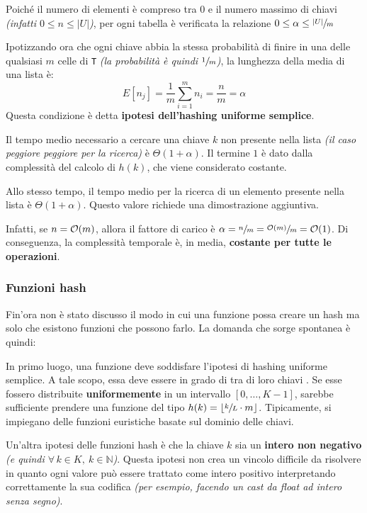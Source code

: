 \documentclass[italian, 10pt]{article}
\begin{document}
Poiché il numero di elementi è compreso tra \(0\) e il numero massimo di chiavi \textit{(infatti \(0 \leq n \leq |U|\))}, per ogni tabella è verificata la relazione \( 0 \leq \alpha \leq \sfrac{|U|}{m} \)

\bigskip
Ipotizzando ora che ogni chiave abbia la stessa probabilità di finire in una delle qualsiasi \(m\) celle di \texttt{T} \textit{(la probabilità è quindi \(\sfrac{1}{m}\))}, la lunghezza della media di una lista è:
\[ E[n_j] = \displaystyle \dfrac{1}{m} \sum_{i=1}^{m} n_i = \dfrac{n}{m} = \alpha \]
Questa condizione è detta \textbf{ipotesi dell'hashing uniforme semplice}.

Il tempo medio necessario a cercare una chiave \(k\) non presente nella lista \textit{(il caso peggiore peggiore per la ricerca)} è \(\Theta(1 + \alpha)\).
Il termine \(1\) è dato dalla complessità del calcolo di \(h(k)\), che viene considerato costante.

\bigskip
Allo stesso tempo, il tempo medio per la ricerca di un elemento presente nella lista è \(\Theta(1+\alpha)\).
Questo valore richiede una dimostrazione aggiuntiva.

Infatti, se \(n = \mathcal{O}(m)\), allora il fattore di carico è \(\alpha = \sfrac{n}{m} = \sfrac{\mathcal{O}(m)}{m} = \mathcal{O}(1)\).
Di conseguenza, la complessità temporale è, in media, \textbf{costante per tutte le operazioni}.

\subsubsection{Funzioni hash}

Fin'ora non è stato discusso il modo in cui una funzione possa creare un hash ma solo che esistono funzioni che possono farlo.
La domanda che sorge spontanea è quindi:


In primo luogo, una funzione deve soddisfare l'ipotesi di hashing uniforme semplice.
A tale scopo, essa deve essere in grado di  tra di loro chiavi .
Se esse fossero distribuite \textbf{uniformemente} in un intervallo \([0, \ldots, K-1]\), sarebbe sufficiente prendere una funzione del tipo \(h(k) = \lfloor \sfrac{k}{L} \cdot m \rfloor\).
Tipicamente, si impiegano delle funzioni euristiche basate sul dominio delle chiavi.

Un'altra ipotesi delle funzioni hash è che la chiave \(k\) sia un \textbf{intero non negativo} \textit{(e quindi \(\forall \, k \in K, \ k \in \mathbb{N}\))}.
Questa ipotesi non crea un vincolo difficile da risolvere in quanto ogni valore può essere trattato come intero positivo interpretando correttamente la sua codifica \textit{(per esempio, facendo un cast da float ad intero senza segno)}.
\end{document}
